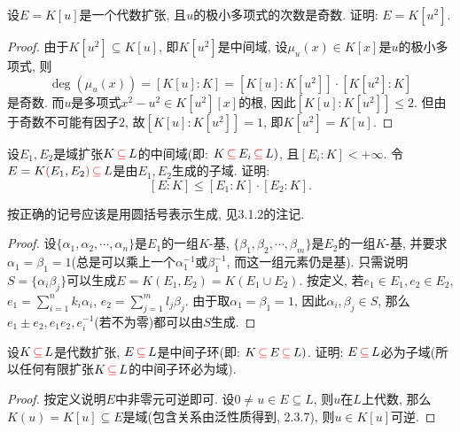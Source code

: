 \documentclass{../solutions-cn}
\begin{document}
\begin{exercise}[习题3.1.7]
    设$E = K[u]$是一个代数扩张, 且$u$的极小多项式的次数是奇数. 证明: $E = K[u^2]$.
\end{exercise}

\begin{proof}
    由于$K[u^2] \subseteq K[u]$, 即$K[u^2]$是中间域, 设$\mu_u(x) \in K[x]$是$u$的极小多项式, 则
    \[
        \deg(\mu_u(x)) = \left[K[u]:K\right] = \left[K[u]:K[u^2]\right] \cdot \left[K[u^2]:K\right]
    \]
    是奇数. 而$u$是多项式$x^2 - u^2 \in K[u^2][x]$的根, 因此$\left[K[u]:K[u^2]\right] \leqslant 2$. 但由于奇数不可能有因子$2$, 故$\left[K[u]:K[u^2]\right] = 1$, 即$K[u^2] = K[u]$.
\end{proof}

\begin{exercise}[习题3.1.8]
    设$E_1, E_2$是域扩张$K \,\textcolor{red}{\subseteq}\, L$的中间域(即: $K \,\textcolor{red}{\subseteq}\, E_i \,\textcolor{red}{\subseteq}\, L)$, 且$[E_i:K] < +\infty$. 令$E = K\textcolor{red}{(}E_1,E_2\textcolor{red}{)} \,\textcolor{red}{\subseteq}\, L$是由$E_1, E_2$生成的子域. 证明:
    \[
        [E:K] \leqslant [E_1:K] \cdot [E_2:K].
    \]
\end{exercise}

\begin{remark}
    按正确的记号应该是用圆括号表示生成, 见3.1.2的注记.
\end{remark}

\begin{proof}
    设$\{\alpha_1, \alpha_2, \cdots, \alpha_n\}$是$E_1$的一组$K$-基, $\{\beta_1, \beta_2, \cdots, \beta_m\}$是$E_2$的一组$K$-基, 并要求$\alpha_1 = \beta_1 = 1$(总是可以乘上一个$\alpha_1^{-1}$或$\beta_1^{-1}$, 而这一组元素仍是基). 只需说明$S = \{\alpha_i\beta_j\}$可以生成$E = K(E_1, E_2) = K(E_1 \cup E_2)$. 按定义, 若$e_1 \in E_1, e_2 \in E_2$, $e_1 = \sum_{i = 1}^{n} k_i\alpha_i$, $e_2 = \sum_{j = 1}^{m} l_j\beta_j$. 由于取$\alpha_1 = \beta_1 = 1$, 因此$\alpha_i, \beta_j \in S$, 那么$e_1 \pm e_2, e_1e_2, e_i^{-1}$(若不为零)都可以由$S$生成.
\end{proof}

\begin{exercise}[习题3.1.9]
    设$K \,\textcolor{red}{\subseteq}\, L$是代数扩张, $E \,\textcolor{red}{\subseteq}\, L$是中间子环(即: $K \,\textcolor{red}{\subseteq}\, E \,\textcolor{red}{\subseteq}\, L)$. 证明: $E \,\textcolor{red}{\subseteq}\, L$必为子域(所以任何有限扩张$K \,\textcolor{red}{\subseteq}\, L$的中间子环必为域).
\end{exercise}

\begin{proof}
    按定义说明$E$中非零元可逆即可. 设$0 \neq u \in E \subseteq L$, 则$u$在$L$上代数, 那么$K(u) = K[u] \subseteq E$是域(包含关系由泛性质得到, 2.3.7), 则$u \in K[u]$可逆.
\end{proof}
\end{document}
